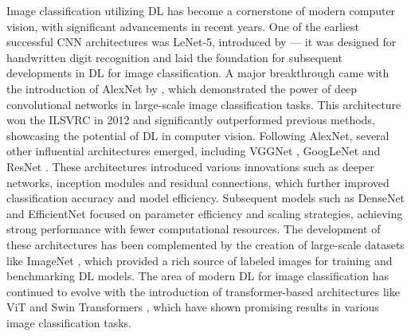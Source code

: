 Image classification utilizing \ac{DL} has become a cornerstone of modern computer vision, with significant advancements in recent years.
One of the earliest successful \ac{CNN} architectures was LeNet-5, introduced by \textcite{lecunGradientbasedLearningApplied1998} --- it was designed for handwritten digit recognition and laid the foundation for subsequent developments in \ac{DL} for image classification.
A major breakthrough came with the introduction of AlexNet by \textcite{krizhevskyImageNetClassificationDeep2012}, which demonstrated the power of deep convolutional networks in large-scale image classification tasks.
This architecture won the \ac{ILSVRC} in 2012 and significantly outperformed previous methods, showcasing the potential of \ac{DL} in computer vision.
Following AlexNet, several other influential architectures emerged, including VGGNet \autocite{simonyanVeryDeepConvolutional2015}, GoogLeNet \autocite{szegedyGoingDeeperConvolutions2015} and ResNet \autocite{heDeepResidualLearning2016}.
These architectures introduced various innovations such as deeper networks, inception modules and residual connections, which further improved classification accuracy and model efficiency.
Subsequent models such as DenseNet \autocite{huangDenselyConnectedConvolutional2017} and EfficientNet \autocite{tanEfficientNetRethinkingModel2019} focused on parameter efficiency and scaling strategies, achieving strong performance with fewer computational resources.
The development of these architectures has been complemented by the creation of large-scale datasets like ImageNet \autocite{dengImageNetLargescaleHierarchical2009}, which provided a rich source of labeled images for training and benchmarking \ac{DL} models.
The area of modern \ac{DL} for image classification has continued to evolve with the introduction of transformer-based architectures like \ac{ViT} \autocite{dosovitskiyImageWorth16x162021} and Swin Transformers \autocite{liuSwinTransformerHierarchical2021}, which have shown promising results in various image classification tasks.

